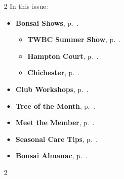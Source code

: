 \setlength{\columnsep}{-5.0cm}
\begin{multicols}{2}
    \noindent\textsf{In this issue:}
    \begin{itemize}
        \item \textsf{\textbf{Bonsai Shows}}, p.~\pageref{2025-07-show}.
        \begin{itemize}
            \item \textsf{\textbf{TWBC Summer Show}}, p.~\pageref{2025-07-show}.
            \item \textsf{\textbf{Hampton Court}}, p.~\pageref{2025-07-show}.
            \item \textsf{\textbf{Chichester}}, p.~\pageref{2025-07-show}.
        \end{itemize}
        \item \textsf{\textbf{Club Workshops}}, p.~\pageref{2025-07-workshop}.
        \item \textsf{\textbf{Tree of the Month}}, p.~\pageref{2025-07-contest}.
        \item \textsf{\textbf{Meet the Member}}, p.~\pageref{2025-07-roots}.
        \item \textsf{\textbf{Seasonal Care Tips}}, p.~\pageref{2025-07-care}.
        \item \textsf{\textbf{Bonsai Almanac}}, p.~\pageref{2025-07-itoigawa}.
    \end{itemize}
    \vfill\null
    \columnbreak

    
\end{multicols}
\pagebreak

\setlength{\columnsep}{0.5cm}
\begin{multicols}{2}
    
    
    
    
    
%    
%    
    
    
    
%    
\end{multicols}
